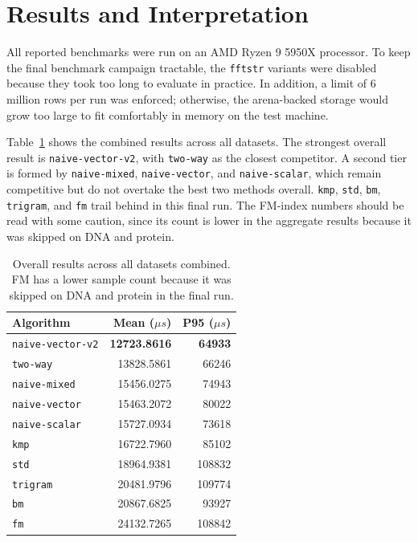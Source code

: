 \documentclass[11pt]{article}
\begin{document}
\section{Results and Interpretation}

All reported benchmarks were run on an AMD Ryzen 9 5950X processor. To keep the final benchmark campaign tractable, the \texttt{fftstr} variants were disabled because they took too long to evaluate in practice. In addition, a limit of 6 million rows per run was enforced; otherwise, the arena-backed storage would grow too large to fit comfortably in memory on the test machine.

Table~\ref{tab:overall-all} shows the combined results across all datasets. The strongest overall result is \texttt{naive-vector-v2}, with \texttt{two-way} as the closest competitor. A second tier is formed by \texttt{naive-mixed}, \texttt{naive-vector}, and \texttt{naive-scalar}, which remain competitive but do not overtake the best two methods overall. \texttt{kmp}, \texttt{std}, \texttt{bm}, \texttt{trigram}, and \texttt{fm} trail behind in this final run. The FM-index numbers should be read with some caution, since its count is lower in the aggregate results because it was skipped on DNA and protein.

\begin{table}[h]
\centering
\small
\begin{tabular}{@{}lrr@{}}
\toprule
Algorithm & Mean (\(\mu s\)) & P95 (\(\mu s\)) \\
\midrule
\texttt{naive-vector-v2} & \textbf{12723.8616} & \textbf{64933} \\
\texttt{two-way}         & 13828.5861          & 66246 \\
\texttt{naive-mixed}     & 15456.0275          & 74943 \\
\texttt{naive-vector}    & 15463.2072          & 80022 \\
\texttt{naive-scalar}    & 15727.0934          & 73618 \\
\texttt{kmp}             & 16722.7960          & 85102 \\
\texttt{std}             & 18964.9381          & 108832 \\
\texttt{trigram}         & 20481.9796          & 109774 \\
\texttt{bm}              & 20867.6825          & 93927 \\
\texttt{fm}              & 24132.7265          & 108842 \\
\bottomrule
\end{tabular}
\caption{Overall results across all datasets combined. FM has a lower sample count because it was skipped on DNA and protein in the final run.}
\label{tab:overall-all}
\end{table}
\end{document}
